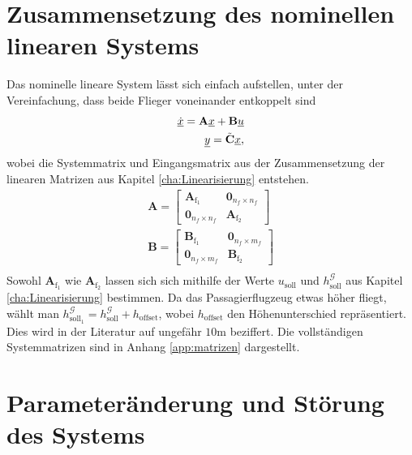 \section{Zusammensetzung des nominellen linearen Systems}
Das nominelle lineare System lässt sich einfach aufstellen, unter der Vereinfachung, dass beide Flieger voneinander entkoppelt sind
\begin{align}
\underline{\dot{x}} = \textbf{A}\underline{x} + \textbf{B}\underline{u}\\
\underline{y} = \Tilde{\textbf{C}}\underline{x},
\end{align}
wobei die Systemmatrix und Eingangsmatrix aus der Zusammensetzung der linearen Matrizen aus Kapitel \ref{cha:Linearisierung} entstehen.
\begin{align}
\textbf{A} = \begin{bmatrix} 
\textbf{A}_\mathrm{f_1}& \textbf{0}_{n_f\times n_f}\\
\textbf{0}_{n_f\times n_f} & \textbf{A}_\mathrm{f_2}
\end{bmatrix}\\
\textbf{B} = \begin{bmatrix} 
\textbf{B}_\mathrm{f_1}& \textbf{0}_{n_f\times m_f}\\
\textbf{0}_{n_f\times m_f} & \textbf{B}_\mathrm{f_2}
\end{bmatrix}\\
\end{align}
Sowohl $\textbf{A}_\mathrm{f_1}$ wie $\textbf{A}_\mathrm{f_2}$ lassen sich sich mithilfe der Werte $u_\mathrm{soll}$ und $h^\mathcal{G}_\mathrm{soll}$ aus Kapitel \ref{cha:Linearisierung} bestimmen. Da das Passagierflugzeug etwas höher fliegt, wählt man $h^\mathcal{G}_\mathrm{soll_1} = h^\mathcal{G}_\mathrm{soll} + h_\mathrm{offset}$, wobei $h_\mathrm{offset}$ den Höhenunterschied repräsentiert. Dies wird in der Literatur \cite{LengthBoom} auf ungefähr $10 \mathrm{m}$ beziffert. Die vollständigen Systemmatrizen sind in Anhang \ref{app:matrizen} dargestellt.
\section{Parameteränderung und Störung des Systems}
